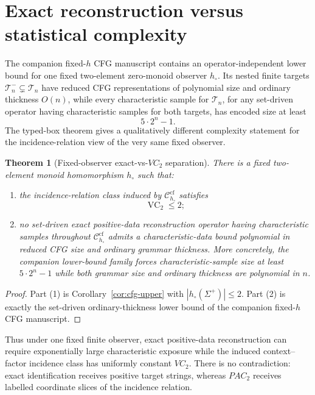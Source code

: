 \documentclass[11pt]{article}
\newtheorem{theorem}{Theorem}[section]
\newcommand{\VC}{\operatorname{VC}}
\begin{document}
\section{Exact reconstruction versus statistical complexity}

The companion fixed-\(h\) CFG manuscript contains an operator-independent
lower bound for one fixed two-element zero-monoid observer \(h_\circ\).
Its nested finite targets \(\mathcal T_n^-\subsetneq\mathcal T_n\) have reduced
CFG representations of polynomial size and ordinary thickness \(O(n)\), while
every characteristic sample for \(\mathcal T_n\), for any set-driven operator
having characteristic samples for both targets, has encoded size at least
\[
  5\cdot 2^n-1.
\]
The typed-box theorem gives a qualitatively different complexity statement
for the incidence-relation view of the very same fixed observer.

\begin{theorem}[Fixed-observer exact-vs-\(VC_2\) separation]
\label{thm:observation-separation}
There is a fixed two-element monoid homomorphism \(h_\circ\) such that:

\begin{enumerate}
\item the incidence-relation class induced by
\(\mathcal C_{h_\circ}^{\mathrm{cf}}\) satisfies
\[
  \VC_2\le2;
\]

\item no set-driven exact positive-data reconstruction operator having
characteristic samples throughout
\(\mathcal C_{h_\circ}^{\mathrm{cf}}\) admits a characteristic-data bound
polynomial in reduced CFG size and ordinary grammar thickness.  More
concretely, the companion lower-bound family forces characteristic-sample
size at least \(5\cdot2^n-1\) while both grammar size and ordinary thickness
are polynomial in \(n\).
\end{enumerate}
\end{theorem}

\begin{proof}
Part (1) is Corollary~\ref{cor:cfg-upper} with
\(|h_\circ(\Sigma^+)|\le2\).  Part (2) is exactly the set-driven
ordinary-thickness lower bound of the companion fixed-\(h\) CFG manuscript.
\end{proof}

Thus under one fixed finite observer, exact positive-data reconstruction can
require exponentially large characteristic exposure while the induced
context--factor incidence class has uniformly constant \(VC_2\).  There is no contradiction: exact
identification receives positive target strings, whereas \(PAC_2\) receives
labelled coordinate slices of the incidence relation.
\end{document}
